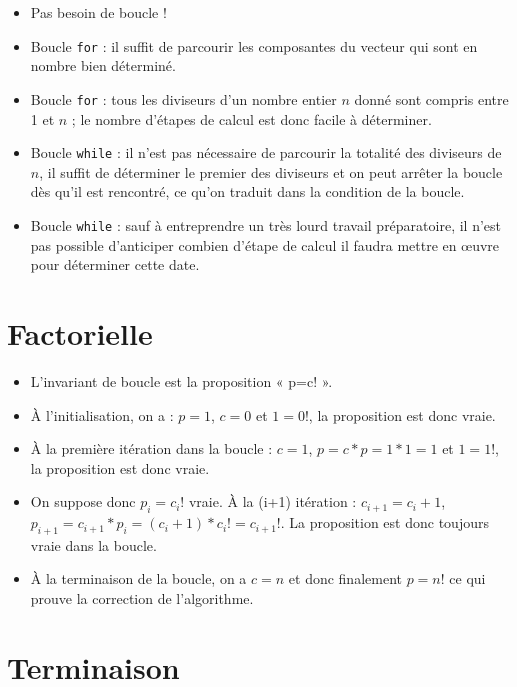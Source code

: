 \begin{itemize}
 \item Pas besoin de boucle !
 \item Boucle \texttt{for} : il suffit de parcourir les composantes du vecteur qui sont en nombre bien déterminé.
 \item Boucle \texttt{for} : tous les diviseurs d'un nombre entier $n$ donné sont compris entre 1 et $n$ ; le nombre d'étapes de calcul est donc facile à déterminer.
 \item Boucle \texttt{while} : il n'est pas nécessaire de parcourir la totalité des diviseurs de $n$, il suffit de déterminer le premier des diviseurs et on peut arrêter la boucle dès qu'il est rencontré, ce qu'on traduit dans la condition de la boucle. 
 \item Boucle \texttt{while} : sauf à entreprendre un très lourd travail préparatoire, il n'est pas possible d'anticiper combien d'étape de calcul il faudra mettre en œuvre pour déterminer cette date.
\end{itemize}

\section{Factorielle}

\begin{itemize}
\item L'invariant de boucle est la proposition « p=c! ».

\item À l'initialisation, on a : $p=1$, $c=0$ et $1=0!$, la proposition est donc vraie.

\item À la première itération dans la boucle : $c=1$, $p=c*p=1*1=1$ et $1=1!$, la proposition est donc vraie.

\item On suppose donc $p_i=c_i!$ vraie. À la (i+1) itération : $c_{i+1}=c_i+1$, $p_{i+1} = c_{i+1}*p_i=(c_i+1)*c_i!=c_{i+1}!$. La proposition est donc toujours vraie dans la boucle.

\item À la terminaison de la boucle, on a $c=n$ et donc finalement $p=n!$ ce qui prouve la correction de l'algorithme.
\end{itemize}

\section{Terminaison}

